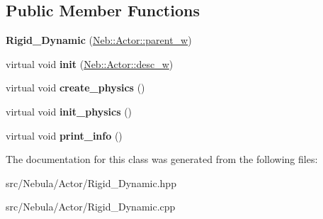 \subsection*{\-Public \-Member \-Functions}
\begin{DoxyCompactItemize}
\item 
\hypertarget{classNeb_1_1Actor_1_1Rigid__Dynamic_a5ac2c9229107dff195609316963e0db2}{{\bfseries \-Rigid\-\_\-\-Dynamic} (\hyperlink{classNeb_1_1weak__ptr}{\-Neb\-::\-Actor\-::parent\-\_\-w})}\label{classNeb_1_1Actor_1_1Rigid__Dynamic_a5ac2c9229107dff195609316963e0db2}

\item 
\hypertarget{classNeb_1_1Actor_1_1Rigid__Dynamic_aa325ed97f9fb69099098cf20e9db1871}{virtual void {\bfseries init} (\hyperlink{classNeb_1_1weak__ptr}{\-Neb\-::\-Actor\-::desc\-\_\-w})}\label{classNeb_1_1Actor_1_1Rigid__Dynamic_aa325ed97f9fb69099098cf20e9db1871}

\item 
\hypertarget{classNeb_1_1Actor_1_1Rigid__Dynamic_adefdc5dc7aeaffe4f11474c6fa8dd5a7}{virtual void {\bfseries create\-\_\-physics} ()}\label{classNeb_1_1Actor_1_1Rigid__Dynamic_adefdc5dc7aeaffe4f11474c6fa8dd5a7}

\item 
\hypertarget{classNeb_1_1Actor_1_1Rigid__Dynamic_a8a5f3edafc98b3e0219e2f5466a96959}{virtual void {\bfseries init\-\_\-physics} ()}\label{classNeb_1_1Actor_1_1Rigid__Dynamic_a8a5f3edafc98b3e0219e2f5466a96959}

\item 
\hypertarget{classNeb_1_1Actor_1_1Rigid__Dynamic_a9c4b73f164c7a5699b769430bedebab4}{virtual void {\bfseries print\-\_\-info} ()}\label{classNeb_1_1Actor_1_1Rigid__Dynamic_a9c4b73f164c7a5699b769430bedebab4}

\end{DoxyCompactItemize}


\-The documentation for this class was generated from the following files\-:\begin{DoxyCompactItemize}
\item 
src/\-Nebula/\-Actor/\-Rigid\-\_\-\-Dynamic.\-hpp\item 
src/\-Nebula/\-Actor/\-Rigid\-\_\-\-Dynamic.\-cpp\end{DoxyCompactItemize}
